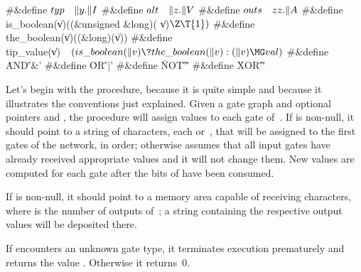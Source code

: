 \8\#\&{define} ${}\\{typ}\hbox{\quad}\|y.\|I{}$\6
\8\#\&{define} ${}\\{alt}\hbox{\quad}\|z.\|V{}$\6
\8\#\&{define} ${}\\{outs}\hbox{\quad}\\{zz}.\|A{}$\6
\8\#\&{define} \\{is\_boolean}(\|v)\5\hbox{\quad}((\&{unsigned} \&{long})(%
\|v)${}\Z\T{1}){}$\6
\8\#\&{define} \\{the\_boolean}(\|v)\5\hbox{\quad}((\&{long})(\|v))\6
\8\#\&{define} \\{tip\_value}(\|v)\5${}\hbox{\quad}(\\{is\_boolean}(\|v)\?%
\\{the\_boolean}(\|v):(\|v)\MG\\{val}){}$\6
\8\#\&{define} \.{AND}\5\hbox{\quad}\.{'\&'}\6
\8\#\&{define} \.{OR}\5\hbox{\quad}\.{'|'}\6
\8\#\&{define} \.{NOT}\5\hbox{\quad}\.{'\~'}\6
\8\#\&{define} \.{XOR}\5\hbox{\quad}\.{'\^'}\par
\fi

Let's begin with the  procedure, because it is quite
simple
and because it illustrates the conventions just explained. Given a gate
graph  and optional pointers  and ,
the procedure
 will assign values to each gate of~. If  is
non-null, it should point to a string of characters, each  or~,
that will be assigned to the first gates of the network, in order;
otherwise  assumes that all input gates have already
received
appropriate values and it will not change them. New values are computed for
each gate after the bits of  have been consumed.

If  is non-null, it should point to a memory area capable of
receiving  characters, where  is the number of outputs
of~;
a string containing the respective output values will be deposited there.

If  encounters an unknown gate type, it terminates execution
prematurely and returns the value . Otherwise it returns~0.


